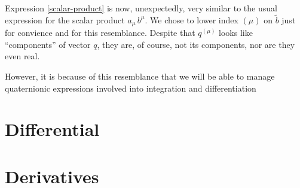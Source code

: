 \documentclass[epsfig,12pt]{article}
\newcommand{\wt}{\widetilde}
\begin{document}
	Expression \eqref{scalar-product} is now, unexpectedly, 
	very similar to the usual expression for the scalar product $ a_\mu\, b^\mu $.
	We chose to lower index $ (\mu) $ on $ \wt b $ just for convience and for this resemblance.
	Despite that $ q^{(\mu)} $ looks like ``components'' of vector $ q $, they are, of course, 
	not its components, nor are they even real.
	
	However, it is because of this resemblance that we will be able to manage quaternionic expressions
	involved into integration and differentiation 

\newpage
\section{Differential}
\label{section-dirac}
\setcounter{equation}{0}


\newpage
\section{Derivatives}
\label{section-dirac}
\setcounter{equation}{0}


\newpage
\end{document}
